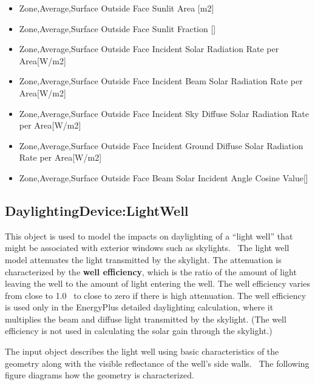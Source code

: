 \begin{itemize}
\item
  Zone,Average,Surface Outside Face Sunlit Area {[}m2{]}
\item
  Zone,Average,Surface Outside Face Sunlit Fraction {[]}
\item
  Zone,Average,Surface Outside Face Incident Solar Radiation Rate per Area{[}W/m2{]}
\item
  Zone,Average,Surface Outside Face Incident Beam Solar Radiation Rate per Area{[}W/m2{]}
\item
  Zone,Average,Surface Outside Face Incident Sky Diffuse Solar Radiation Rate per Area{[}W/m2{]}
\item
  Zone,Average,Surface Outside Face Incident Ground Diffuse Solar Radiation Rate per Area{[}W/m2{]}
\item
  Zone,Average,Surface Outside Face Beam Solar Incident Angle Cosine Value{[]}
\end{itemize}

\subsection{DaylightingDevice:LightWell}\label{daylightingdevicelightwell}

This object is used to model the impacts on daylighting of a ``light well'' that might be associated with exterior windows such as skylights.~ The light well model attenuates the light transmitted by the skylight. The attenuation is characterized by the \textbf{well efficiency}, which is the ratio of the amount of light leaving the well to the amount of light entering the well. The well efficiency varies from close to 1.0~ to close to zero if there is high attenuation. The well efficiency is used only in the EnergyPlus detailed daylighting calculation, where it multiplies the beam and diffuse light transmitted by the skylight. (The well efficiency is not used in calculating the solar gain through the skylight.)

The input object describes the light well using basic characteristics of the geometry along with the visible reflectance of the well's side walls.~ The following figure diagrams how the geometry is characterized.

